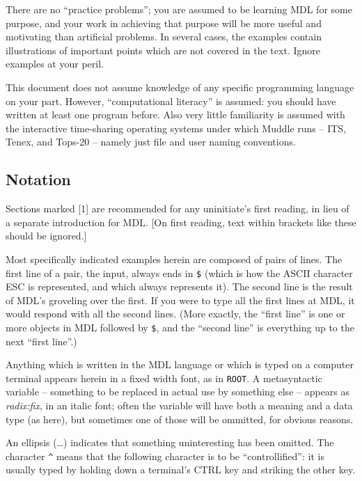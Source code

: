 \documentclass[a4paper]{scrbook}
\begin{document}
There are no ``practice problems''; you are assumed to be learning MDL for some purpose, and your work in achieving that
purpose will be more useful and motivating than artificial problems. In several cases, the examples contain illustrations
of important points which are not covered in the text. Ignore examples at your peril.

This document does not assume knowledge of any specific programming language on your part. However, ``computational
literacy'' is assumed: you should have written at least one program before. Also very little familiarity is assumed with
the interactive time-sharing operating systems under which Muddle runs -- ITS, Tenex, and Tops-20 -- namely just file and
user naming conventions.

\subsection*{Notation}\label{notation}

Sections marked {[}1{]} are recommended for any uninitiate's first reading, in lieu of a separate introduction for MDL.
{[}On first reading, text within brackets like these should be ignored.{]}

Most specifically indicated examples herein are composed of pairs of lines. The first line of a pair, the input, always
ends in \texttt{\$}  (which is how the ASCII character ESC is represented, and which always
represents it). The second line is the result of MDL's groveling over the first. If you were to type all the first lines at
MDL, it would respond with all the second lines. (More exactly, the ``first line'' is one or more objects in MDL followed
by \texttt{\$}, and the ``second line'' is everything up to the next ``first line''.)

Anything which is written in the MDL language or which is typed on a computer terminal appears herein in a fixed width
font, as in \texttt{ROOT}. A metasyntactic variable -- something to be replaced in actual use by something else -- appears
as \emph{radix:fix}, in an italic font; often the variable will have both a meaning and a data type (as here), but
sometimes one of those will be ommitted, for obvious reasons.

An ellipsis (\ldots{}) indicates that something uninteresting has been omitted. The character
\texttt{\^{}} means that the following character is to be ``controllified'': it is usually
typed by holding down a terminal's CTRL key and striking the other key.
\end{document}
